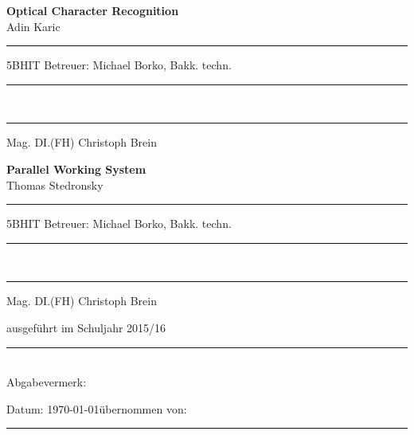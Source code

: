 \documentclass[12pt]{article}
\begin{document}
\begin{titlepage}
\textbf{Optical Character Recognition}\\
Adin Karic \rule[-0.2cm]{1.8cm}{0pt} 5BHIT \hfill Betreuer: Michael Borko, Bakk. techn. \rule[-0.2cm]{0.4cm}{0pt}\\
\rule[-0.2cm]{9.8cm}{0pt} Mag. DI.(FH) Christoph Brein

\textbf{Parallel Working System}\\
Thomas Stedronsky \rule[-0.2cm]{0.2cm}{0pt} 5BHIT \hfill Betreuer: Michael Borko, Bakk. techn. \rule[-0.2cm]{0.4cm}{0pt}\\
\rule[-0.2cm]{9.8cm}{0pt} Mag. DI.(FH) Christoph Brein

\vspace{25mm}

ausgeführt im Schuljahr 2015/16

\rule{1.0\textwidth}{0.3mm}\\
Abgabevermerk: 

Datum: \today \hfill \hfill übernommen von:\rule[-0.2cm]{3cm}{0pt}

\begin{center}

\noindent 

\vfill

\end{center}
\end{titlepage}


\ohead{\headmark}
\ofoot{\pagemark}
\end{document}
